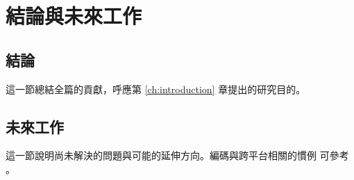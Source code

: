 
\chapter{結論與未來工作}
\label{ch:conclusion}

\section{結論}
\label{sec:conclusion}

這一節總結全篇的貢獻，呼應第 \ref{ch:introduction} 章提出的研究目的。

\section{未來工作}
\label{sec:future-work}

這一節說明尚未解決的問題與可能的延伸方向。編碼與跨平台相關的慣例
可參考 \cite{unicode2023standard}。
